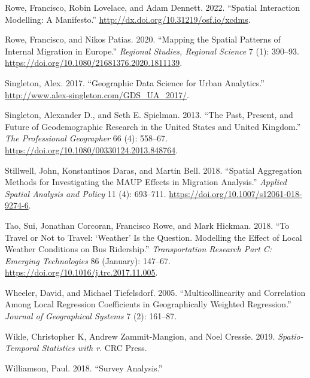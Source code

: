 \documentclass[
  letterpaper,
  krantz2]{style/krantz}
\newlength{\cslhangindent}
\newlength{\cslentryspacingunit} %
\newenvironment{CSLReferences}[2] %
 {%
  \setlength{\parindent}{0pt}
  \ifodd #1
  \let\oldpar\par
  \def\par{\hangindent=\cslhangindent\oldpar}
  \fi
  \setlength{\parskip}{#2\cslentryspacingunit}
 }%
 {}
\begin{document}
\begin{CSLReferences}{1}{0}
\leavevmode{}%
Rowe, Francisco, Robin Lovelace, and Adam Dennett. 2022. {``Spatial
Interaction Modelling: A Manifesto.''}
\url{http://dx.doi.org/10.31219/osf.io/xcdms}.

\leavevmode{}%
Rowe, Francisco, and Nikos Patias. 2020. {``Mapping the Spatial Patterns
of Internal Migration in Europe.''} \emph{Regional Studies, Regional
Science} 7 (1): 390--93.
\url{https://doi.org/10.1080/21681376.2020.1811139}.

\leavevmode{}%
Singleton, Alex. 2017. {``Geographic Data Science for Urban
Analytics.''} \url{http://www.alex-singleton.com/GDS_UA_2017/}.

\leavevmode{}%
Singleton, Alexander D., and Seth E. Spielman. 2013. {``The Past,
Present, and Future of Geodemographic Research in the United States and
United Kingdom.''} \emph{The Professional Geographer} 66 (4): 558--67.
\url{https://doi.org/10.1080/00330124.2013.848764}.

\leavevmode{}%
Stillwell, John, Konstantinos Daras, and Martin Bell. 2018. {``Spatial
Aggregation Methods for Investigating the MAUP Effects in Migration
Analysis.''} \emph{Applied Spatial Analysis and Policy} 11 (4):
693--711. \url{https://doi.org/10.1007/s12061-018-9274-6}.

\leavevmode{}%
Tao, Sui, Jonathan Corcoran, Francisco Rowe, and Mark Hickman. 2018.
{``To Travel or Not to Travel: {`}Weather{'} Is the Question. Modelling
the Effect of Local Weather Conditions on Bus Ridership.''}
\emph{Transportation Research Part C: Emerging Technologies} 86
(January): 147--67. \url{https://doi.org/10.1016/j.trc.2017.11.005}.

\leavevmode{}%
Wheeler, David, and Michael Tiefelsdorf. 2005. {``Multicollinearity and
Correlation Among Local Regression Coefficients in Geographically
Weighted Regression.''} \emph{Journal of Geographical Systems} 7 (2):
161--87.

\leavevmode{}%
Wikle, Christopher K, Andrew Zammit-Mangion, and Noel Cressie. 2019.
\emph{Spatio-Temporal Statistics with r}. CRC Press.

\leavevmode{}%
Williamson, Paul. 2018. {``Survey Analysis.''}


\end{CSLReferences}
\end{document}
